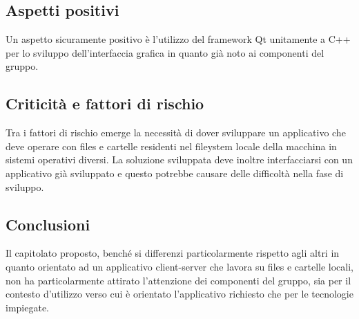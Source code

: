 \subsection{Aspetti positivi}
Un aspetto sicuramente positivo è l’utilizzo del framework Qt unitamente a C++  per lo sviluppo dell’interfaccia grafica in quanto già noto ai componenti del gruppo.


\subsection{Criticità e fattori di rischio}
Tra i fattori di rischio emerge la necessità di dover sviluppare un applicativo che deve operare con files e cartelle residenti nel fileystem locale della macchina in sistemi operativi diversi.
La soluzione sviluppata deve inoltre interfacciarsi con un applicativo già sviluppato e questo potrebbe causare delle difficoltà nella fase di sviluppo.

\subsection{Conclusioni}
Il capitolato proposto, benché si differenzi particolarmente rispetto agli altri in quanto orientato ad un applicativo client-server che lavora su files e cartelle locali, non ha particolarmente attirato l’attenzione dei componenti del gruppo, sia per il contesto d'utilizzo verso cui è orientato l’applicativo richiesto che per le tecnologie impiegate.

\newpage
